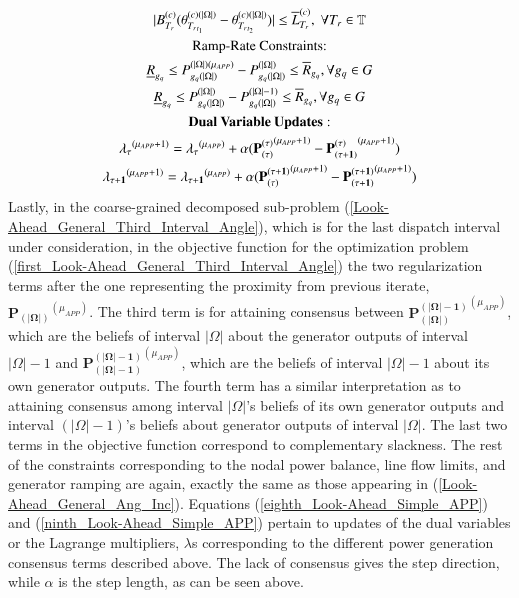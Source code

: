 \documentclass[preprint,12pt,3p]{elsarticle}
\begin{document}
\begin{subequations}
\begin{gather}
|B_{T_r}^{(c)}(\theta_{{T_r}_{t_1}}^{(c)(|\Omega|)}-\theta_{{T_r}_{t_2}}^{(c)(|\Omega|)})|\leq{{\overline{L}}_{T_r}^{(c)}},\;\forall{T_r\in{\mathbb{T}}}\label{third1_Look-Ahead_General_Third_Interval_Angle}\\
\text{Ramp-Rate Constraints:}\notag\\
\underline{R}_{g_q}\leq P_{{g_q}(|\Omega|)}^{(|\Omega|)(\mu_{APP})}-P_{{g_q}(|\Omega|)}^{(|\Omega|)}\leq \overline{R}_{g_q},\forall {g_q}\in G\label{fourth_Look-Ahead_General_Third_Interval_Angle}\\
\underline{R}_{g_q}\leq P_{{g_q}(|\Omega|)}^{(|\Omega|)}-P_{{g_q}(|\Omega|)}^{(|\Omega|-1)}\leq \overline{R}_{g_q},\forall {g_q}\in G\label{fifth_Look-Ahead_General_Third_Interval_Angle}\\
\mathbf{Dual\:Variable \:Updates:}\notag\\
\mathbf{\lambda_{\tau}}^{(\mu_{APP}+1)}=\mathbf{\lambda_{\tau}}^{(\mu_{APP})}+\alpha(\mathbf{P_{({\tau})}^{({\tau})}}^{(\mu_{APP}+1)}-\mathbf{P_{({\tau}+1)}^{({\tau})}}^{(\mu_{APP}+1)})\label{eighth_Look-Ahead_Simple_APP}\\
\mathbf{\lambda_{\tau+1}}^{(\mu_{APP}+1)}=\mathbf{\lambda_{\tau+1}}^{(\mu_{APP})}+\alpha(\mathbf{P_{({\tau})}^{({\tau+1})}}^{(\mu_{APP}+1)}-\mathbf{P_{({\tau+1})}^{({\tau+1})}}^{(\mu_{APP}+1)})\label{ninth_Look-Ahead_Simple_APP}
\end{gather}
\end{subequations}
Lastly, in the coarse-grained decomposed sub-problem (\ref{Look-Ahead_General_Third_Interval_Angle}), which is for the last dispatch interval under consideration, in the objective function for the optimization problem (\ref{first_Look-Ahead_General_Third_Interval_Angle}) the two regularization terms after the one representing the proximity from previous iterate, $\mathbf{P_{(|\Omega|)}}^{(\mu_{APP})}$. The third term is for attaining consensus between $\mathbf{P_{(|\Omega|)}^{(|\Omega|-1)}}^{(\mu_{APP})}$, which are the beliefs of interval $|\Omega|$ about the generator outputs of interval $|\Omega|-1$ and $\mathbf{P_{(|\Omega|-1)}^{(|\Omega|-1)}}^{(\mu_{APP})}$, which are the beliefs of interval $|\Omega|-1$ about its own generator outputs.  The fourth term has a similar interpretation as to attaining consensus among interval $|\Omega|$'s beliefs of its own generator outputs and interval $(|\Omega|-1)$'s beliefs about generator outputs of interval $|\Omega|$. The last two terms in the objective function correspond to complementary slackness. The rest of the constraints corresponding to the nodal power balance, line flow limits, and generator ramping are again, exactly the same as those appearing in (\ref{Look-Ahead_General_Ang_Inc}). Equations (\ref{eighth_Look-Ahead_Simple_APP}) and (\ref{ninth_Look-Ahead_Simple_APP}) pertain to updates of the dual variables or the Lagrange multipliers, $\lambda$s corresponding to the different power generation consensus terms described above. The lack of consensus gives the step direction, while $\alpha$ is the step length, as can be seen above.\\
\end{document}

